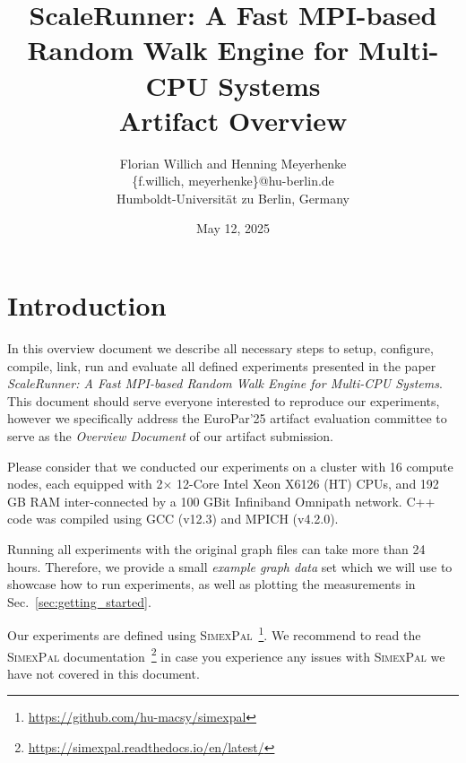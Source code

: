 \documentclass[11pt, a4paper]{scrartcl}
\newcommand{\simex}{\textsc{Simex\-Pal}\xspace}
\begin{document}
\lstset{  
  tabsize=2, 
  showspaces=false, 
  showstringspaces=false, 
  float=[htb], 
  captionpos=b, 
  basicstyle=\ttfamily\footnotesize,
  frame=single, %
  numbers=left, 
  numberstyle=\tiny, 
  numberblanklines=false, 
  breaklines=true
} 

\title{\small{ScaleRunner: A Fast MPI-based \\ Random Walk Engine for Multi-CPU Systems} \\ \LARGE{Artifact Overview}}

\author{Florian Willich and Henning Meyerhenke \\ \{f.willich, meyerhenke\}@hu-berlin.de \\ Humboldt-Universit\"at zu Berlin, Germany}

\date{May 12, 2025}

\maketitle

\section{Introduction}

In this overview document we describe all necessary steps to setup, configure,
compile, link, run and evaluate all defined experiments presented in the paper
\textit{ScaleRunner: A Fast MPI-based Random Walk Engine for Multi-CPU Systems}.
This document should serve everyone interested to reproduce our experiments,
however we specifically address the EuroPar'25 artifact evaluation committee to
serve as the \emph{Overview Document} of our artifact submission.

Please consider that we conducted our experiments on a cluster with 16 compute
nodes, each equipped with 2$\times$ 12-Core Intel Xeon X6126 (HT) CPUs, and 192
GB RAM inter-connected by a 100 GBit Infiniband Omnipath network. C++ code was
compiled using GCC (v12.3) and MPICH (v4.2.0).

Running all experiments with the original graph files can take more than 24
hours. Therefore, we provide a small \emph{example graph data} set which we will
use to showcase how to run experiments, as well as plotting the measurements in
Sec.~\ref{sec:getting_started}.

Our experiments are defined using
\simex~\footnote{\url{https://github.com/hu-macsy/simexpal}}. We recommend to
read the \simex
documentation~\footnote{\url{https://simexpal.readthedocs.io/en/latest/}} in
case you experience any issues with \simex we have not covered in this
document.
\end{document}
